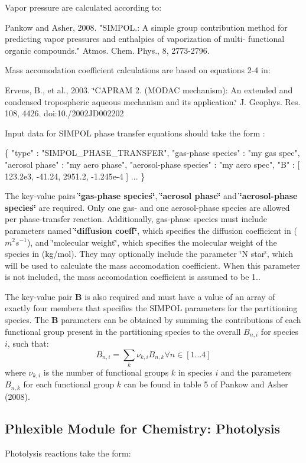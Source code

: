 Vapor pressure are calculated according to\+:

Pankow and Asher, 2008. "S\+I\+M\+P\+O\+L.\+: A simple group contribution method for predicting vapor pressures and enthalpies of vaporization of multi-\/ functional organic compounds." Atmos. Chem. Phys., 8, 2773-\/2796.

Mass accomodation coefficient calculations are based on equations 2-\/4 in\+:

Ervens, B., et al., 2003. \char`\"{}\+C\+A\+P\+R\+A\+M 2. (\+M\+O\+D\+A\+C mechanism)\+: An extended
 and condensed tropospheric aqueous mechanism and its application.\char`\"{} J. Geophys. Res. 108, 4426. doi\+:10./2002\+J\+D002202

Input data for S\+I\+M\+P\+OL phase transfer equations should take the form \+: 
\begin{DoxyCode}
\{
  "type" : "SIMPOL\_PHASE\_TRANSFER",
  "gas-phase species" : "my gas spec",
  "aerosol phase" : "my aero phase",
  "aerosol-phase species" : "my aero spec",
  "B" : [ 123.2e3, -41.24, 2951.2, -1.245e-4 ]
    ...
\}
\end{DoxyCode}
 The key-\/value pairs {\bfseries \char`\"{}gas-\/phase species\char`\"{}}, {\bfseries \char`\"{}aerosol phase\char`\"{}} and {\bfseries \char`\"{}aerosol-\/phase species\char`\"{}} are required. Only one gas-\/ and one aerosol-\/phase species are allowed per phase-\/transfer reaction. Additionally, gas-\/phase species must include parameters named {\bfseries \char`\"{}diffusion coeff\char`\"{}}, which specifies the diffusion coefficient in ( $m^2s^{-1}$), and \char`\"{}molecular weight\char`\"{}, which specifies the molecular weight of the species in (kg/mol). They may optionally include the parameter \char`\"{}\+N star\char`\"{}, which will be used to calculate the mass accomodation coefficient. When this parameter is not included, the mass accomodation coefficient is assumed to be 1..

The key-\/value pair {\bfseries B} is also required and must have a value of an array of exactly four members that specifies the S\+I\+M\+P\+OL parameters for the partitioning species. The {\bfseries B} parameters can be obtained by summing the contributions of each functional group present in the partitioning species to the overall $B_{n,i}$ for species $i$, such that\+: \[ B_{n,i} = \sum_{k} \nu_{k,i} B_{n,k} \forall n \in [1...4] \] where $\nu_{k,i}$ is the number of functional groups $k$ in species $i$ and the parameters $B_{n,k}$ for each functional group $k$ can be found in table 5 of Pankow and Asher (2008). \hypertarget{phlex_rxn_photolysis}{}\subsection{Phlexible Module for Chemistry\+: Photolysis}\label{phlex_rxn_photolysis}
Photolysis reactions take the form\+:

